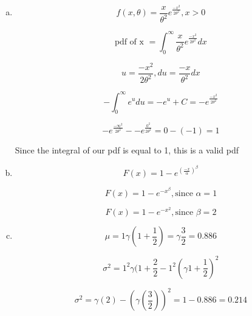\documentclass[14pt]{article}
\begin{document}
\begin{enumerate}[(a)]

\item

\[ 
f(x,\theta) = \frac{x}{\theta^2}e^{\frac{-x^2}{2\theta^2}}, x>0
\]

\[
\text{pdf of x } = \int_{0}^{\infty}\frac{x}{\theta^2}e^{\frac{-x^2}{2\theta^2}}dx
\]

\[
u = \frac{-x^2}{2\theta^2}, du = \frac{-x}{\theta^2}dx
\]

\[
- \int_{0}^{\infty}e^u du = -e^u + C = -e^{\frac{-x^2}{2\theta^2}} 
\]

\[
-e^{\frac{-\infty^2}{2\theta^2}} - -e^{\frac{0^2}{2\theta^2}} = 0 - (-1) = 1
\]

Since the integral of our pdf is equal to 1, this is a valid pdf


\item

\[
F(x) = 1 - e^{(\frac{-x}{\alpha})^\beta}
\]

\[
F(x) = 1 - e^{-x^\beta}, \text{since }  \alpha = 1
\]

\[
F(x) = 1 - e^{-x^2}, \text{since }  \beta = 2
\]


\item

\[
\mu = 1 \gamma(1+\frac{1}{2}) = \gamma{\frac{3}{2}} = 0.886
\]

\[
\sigma^2 = 1^2 \gamma(1 + \frac{2}{2} - 1^2 (\gamma{1 + \frac{1}{2}})^2
\]

\[
\sigma^2 = \gamma(2) - (\gamma(\frac{3}{2}))^2 = 1 - 0.886 = 0.214
\]

\end{enumerate}
\end{document}
